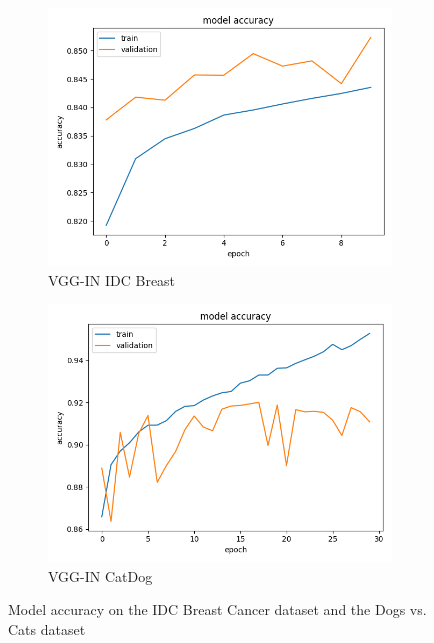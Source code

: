 \begin{figure}
\begin{subfigure}[b]{.45\linewidth}
\includegraphics[width=\linewidth]{Figs/vgg_in_breast_acc.jpg}
\caption{VGG-IN IDC Breast}
\end{subfigure}
\begin{subfigure}[b]{.45\linewidth}
\includegraphics[width=\linewidth]{Figs/vgg_in_catdog_acc.jpg}
\caption{VGG-IN CatDog}
\end{subfigure}

\caption{Model accuracy on the IDC Breast Cancer dataset and the Dogs vs. Cats dataset}
\label{fig:acc2}
\end{figure}
